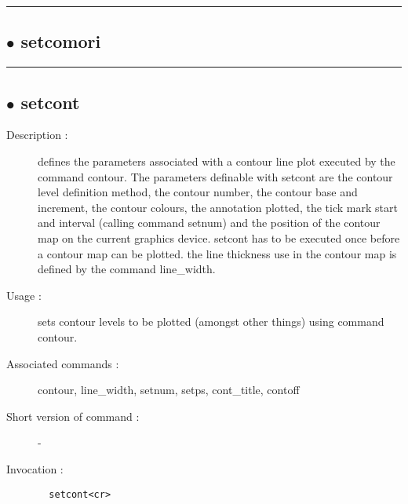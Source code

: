 \hrule \subsection*{$\bullet$ setcomori}

\hrule \subsection*{$\bullet$ setcont}
\begin{description}
\item[Description :] defines the parameters associated with a contour line plot
executed by the command contour.  The parameters definable with setcont
are the contour level definition method, the contour number, the contour
base and increment, the contour colours, the annotation plotted, the tick
mark start and interval (calling command setnum) and the position of the
contour map on the current graphics device.  setcont has to be executed
once before a contour map can be plotted.  the line thickness use in the
contour map is defined by the command line\_width.
\item[Usage :] sets contour levels to be plotted (amongst other things) using
command contour.
\item[Associated commands :] contour, line\_width, setnum, setps, cont\_title,
contoff
\item[Short version of command :] -
\item[Invocation :]

\verb+  setcont<cr> +\end{description}

